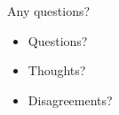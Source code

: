\documentclass[xcolor=table,aspectratio=169]{beamer}
\begin{document}
\begin{frame}{Any questions?}

	\begin{itemize}
	\item Questions?
	\item Thoughts?
	\item Disagreements?
	\end{itemize}
\end{frame}
\end{document}
